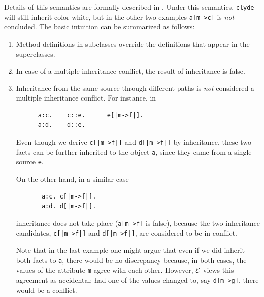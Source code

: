 \documentclass[11pt]{article}
\newcommand{\ERGO}{\mbox{\ensuremath{\cal{E}}\smaller{{\sc{RGO}}}}\xspace}
\newcommand{\FLSYSTEM}{\ERGO}
\begin{document}
Details of this semantics are formally described in
\cite{inheritance-odbase-02}.  Under this semantics, {\tt clyde} will still
inherit color white, but in the other two examples {\tt a[m->c]} is
\emph{not} concluded.  The basic intuition can be summarized as follows:
\begin{enumerate}
\item  Method definitions in subclasses override the definitions that
  appear in the superclasses.
\item In case of a multiple inheritance conflict, the result of inheritance
  is false.
\item  Inheritance from the same source through different paths is
  \emph{not} considered a multiple inheritance conflict. For instance, in
  \begin{verbatim}
      a:c.    c::e.      e[|m->f|].    
      a:d.    d::e.
  \end{verbatim}
  Even though we derive {\tt c[|m->f|]} and {\tt d[|m->f|]} by inheritance,
  these two facts can be further inherited to the object {\tt a}, since
  they came from a single source {\tt e}.

  On the other hand, in a similar case
  \begin{verbatim}
       a:c. c[|m->f|].    
       a:d. d[|m->f|].     
  \end{verbatim}
  inheritance does not take place ({\tt a[m->f]} is false),
  because the two inheritance candidates, {\tt c[|m->f|]} and
  {\tt d[|m->f|]}, are considered to be in conflict.

  Note that in the last example one might argue that even if we did inherit
  both facts to {\tt a}, there would be no discrepancy because, in both
  cases, the values of the attribute {\tt m} agree with each other.
  However, \FLSYSTEM views this agreement as accidental:
  had one of the values changed to, say
  {\tt d[m->g]}, there would be a conflict.
  

\end{enumerate}
\end{document}
